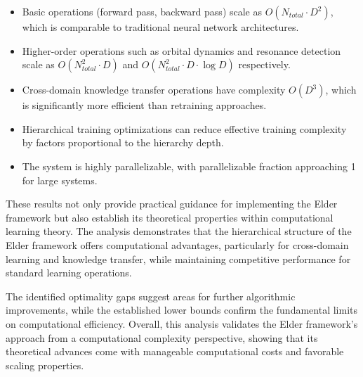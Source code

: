 \begin{itemize}
    \item Basic operations (forward pass, backward pass) scale as $O(N_{total} \cdot D^2)$, which is comparable to traditional neural network architectures.
    \item Higher-order operations such as orbital dynamics and resonance detection scale as $O(N_{total}^2 \cdot D)$ and $O(N_{total}^2 \cdot D \cdot \log D)$ respectively.
    \item Cross-domain knowledge transfer operations have complexity $O(D^3)$, which is significantly more efficient than retraining approaches.
    \item Hierarchical training optimizations can reduce effective training complexity by factors proportional to the hierarchy depth.
    \item The system is highly parallelizable, with parallelizable fraction approaching 1 for large systems.
\end{itemize}

These results not only provide practical guidance for implementing the Elder framework but also establish its theoretical properties within computational learning theory. The analysis demonstrates that the hierarchical structure of the Elder framework offers computational advantages, particularly for cross-domain learning and knowledge transfer, while maintaining competitive performance for standard learning operations.

The identified optimality gaps suggest areas for further algorithmic improvements, while the established lower bounds confirm the fundamental limits on computational efficiency. Overall, this analysis validates the Elder framework's approach from a computational complexity perspective, showing that its theoretical advances come with manageable computational costs and favorable scaling properties.